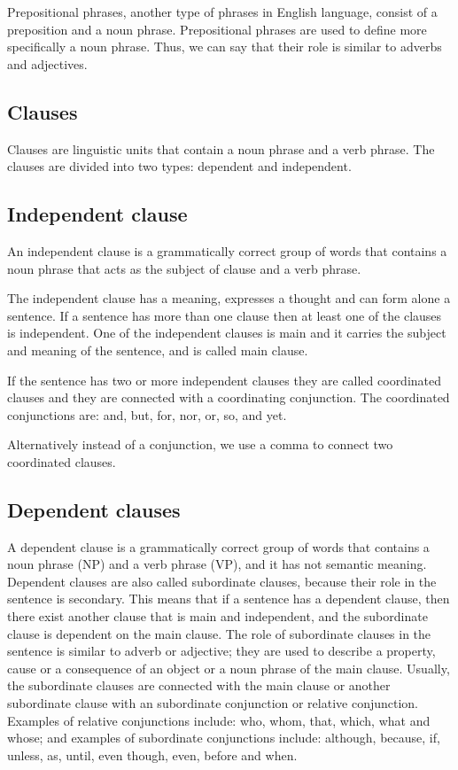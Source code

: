 \vspace{4mm}

Prepositional phrases, another type of phrases in English language, consist of a preposition and a noun phrase. Prepositional phrases are used to define more specifically a noun phrase. Thus, we can say that their role is similar to adverbs and adjectives.

\subsection{Clauses}

Clauses are linguistic units that contain a noun phrase and a verb phrase. The clauses are divided into two types: dependent and independent.

\subsection{Independent clause}

An independent clause is a grammatically correct group of words that contains a noun phrase that acts as the subject of clause and a verb phrase.

The independent clause has a meaning, expresses a thought and can form alone a sentence. If a sentence has more than one clause then at least one of the clauses is independent. One of the independent clauses is main and it carries the subject and meaning of the sentence, and is called main clause.

If the sentence has two or more independent clauses they are called coordinated clauses and they are connected with a coordinating conjunction. The coordinated conjunctions are: and, but, for, nor, or, so, and yet.

Alternatively instead of a conjunction, we use a comma to connect two coordinated clauses.

\subsection{Dependent clauses}

A dependent clause is a grammatically correct group of words that contains a noun phrase (NP) and a verb phrase (VP), and it has not semantic meaning. Dependent clauses are also called subordinate clauses, because their role in the sentence is secondary. This means that if a sentence has a dependent clause, then there exist another clause that is main and independent, and the subordinate clause is dependent on the main clause. The role of subordinate clauses in the sentence is similar to adverb or adjective; they are used to describe a property, cause or a consequence of an object or a noun phrase of the main clause. Usually, the subordinate clauses are connected with the main clause or another subordinate clause with an subordinate conjunction or relative conjunction. Examples of relative conjunctions include: who, whom, that, which, what and whose; and examples of subordinate conjunctions include: although, because, if, unless, as, until, even though, even, before and when.

